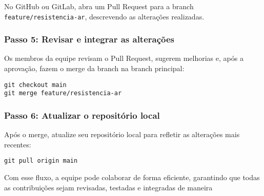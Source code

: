 No GitHub ou GitLab, abra um Pull Request para a branch \texttt{feature/resistencia-ar}, descrevendo as alterações realizadas.

\subsubsection*{Passo 5: Revisar e integrar as alterações}

Os membros da equipe revisam o Pull Request, sugerem melhorias e, após a aprovação, fazem o merge da branch na branch principal:
\begin{lstlisting}[style=shellstyle]
git checkout main
git merge feature/resistencia-ar
\end{lstlisting}

\subsubsection*{Passo 6: Atualizar o repositório local}

Após o merge, atualize seu repositório local para refletir as alterações mais recentes:
\begin{lstlisting}[style=shellstyle]
git pull origin main
\end{lstlisting}

Com esse fluxo, a equipe pode colaborar de forma eficiente, garantindo que todas as contribuições sejam revisadas, testadas e integradas de maneira